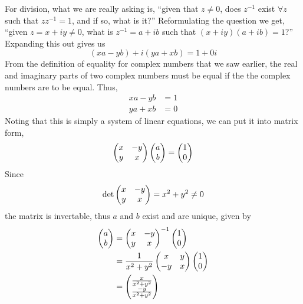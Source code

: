 \documentclass[10pt]{scrartcl}
\numberwithin{equation}{subsection}
\theoremstyle{definition}
\theoremstyle{remark}
\newcommand{\inv}[1]{
	{#1}^{-1}
}
\begin{document}
For division, what we are really asking is, 
``given that $z \neq 0$, does $\inv{z}$ exist $\forall z$ such that $z \inv{z} = 1$, and if so, what is it?'' 
Reformulating the question we get,
``given $z = x + iy \neq 0$, what is $\inv{z} = a + ib$ such that $(x+iy)(a+ib) = 1$?''
Expanding this out gives us
\[
(xa - yb) + i(ya + xb) = 1 + 0i
\]
From the definition of equality for complex numbers that we saw earlier,
the real and imaginary parts of two complex numbers must be equal if the the
complex numbers are to be equal. Thus,
\begin{align*}
xa - yb &= 1 \\
ya + xb &= 0
\end{align*}
Noting that this is simply a system of linear equations, we can put it into
matrix form,
\[
\pmqty{x & -y \\ y & x} \pmqty{a \\ b} = \pmqty{1 \\ 0}
\]
Since 
\[
\det \pmqty{x & -y \\ y & x}  = x^2 + y^2 \neq 0
\]
the matrix is invertable, thus $a$ and $b$ exist and are unique, given by
\begin{align*}
\pmqty{a \\ b} &= \inv{\pmqty{x & -y \\ y & x}} \pmqty{1 \\ 0} \\
&= \frac{1}{x^2 + y^2} \pmqty{x & y \\ -y & x } \pmqty{1 \\ 0} \\
&= \pmqty{\frac{x}{x^2+y^2} \\ \frac{-y}{x^2+y^2}} \\
\end{align*}
\end{document}
